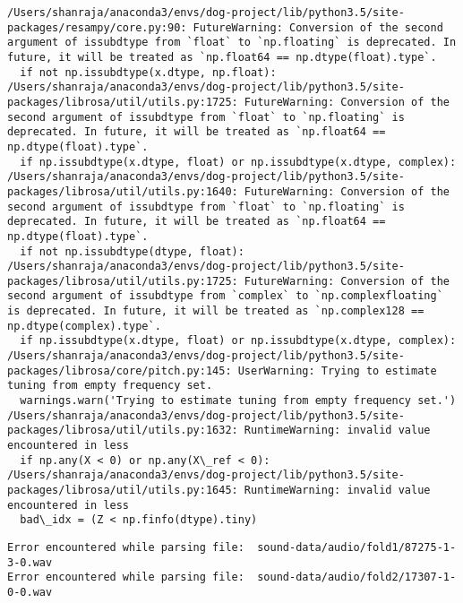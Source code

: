 \documentclass[11pt]{article}
\begin{document}
    \begin{Verbatim}[commandchars=\\\{\}]
/Users/shanraja/anaconda3/envs/dog-project/lib/python3.5/site-packages/resampy/core.py:90: FutureWarning: Conversion of the second argument of issubdtype from `float` to `np.floating` is deprecated. In future, it will be treated as `np.float64 == np.dtype(float).type`.
  if not np.issubdtype(x.dtype, np.float):
/Users/shanraja/anaconda3/envs/dog-project/lib/python3.5/site-packages/librosa/util/utils.py:1725: FutureWarning: Conversion of the second argument of issubdtype from `float` to `np.floating` is deprecated. In future, it will be treated as `np.float64 == np.dtype(float).type`.
  if np.issubdtype(x.dtype, float) or np.issubdtype(x.dtype, complex):
/Users/shanraja/anaconda3/envs/dog-project/lib/python3.5/site-packages/librosa/util/utils.py:1640: FutureWarning: Conversion of the second argument of issubdtype from `float` to `np.floating` is deprecated. In future, it will be treated as `np.float64 == np.dtype(float).type`.
  if not np.issubdtype(dtype, float):
/Users/shanraja/anaconda3/envs/dog-project/lib/python3.5/site-packages/librosa/util/utils.py:1725: FutureWarning: Conversion of the second argument of issubdtype from `complex` to `np.complexfloating` is deprecated. In future, it will be treated as `np.complex128 == np.dtype(complex).type`.
  if np.issubdtype(x.dtype, float) or np.issubdtype(x.dtype, complex):
/Users/shanraja/anaconda3/envs/dog-project/lib/python3.5/site-packages/librosa/core/pitch.py:145: UserWarning: Trying to estimate tuning from empty frequency set.
  warnings.warn('Trying to estimate tuning from empty frequency set.')
/Users/shanraja/anaconda3/envs/dog-project/lib/python3.5/site-packages/librosa/util/utils.py:1632: RuntimeWarning: invalid value encountered in less
  if np.any(X < 0) or np.any(X\_ref < 0):
/Users/shanraja/anaconda3/envs/dog-project/lib/python3.5/site-packages/librosa/util/utils.py:1645: RuntimeWarning: invalid value encountered in less
  bad\_idx = (Z < np.finfo(dtype).tiny)

    \end{Verbatim}

    \begin{Verbatim}[commandchars=\\\{\}]
Error encountered while parsing file:  sound-data/audio/fold1/87275-1-3-0.wav
Error encountered while parsing file:  sound-data/audio/fold2/17307-1-0-0.wav

    \end{Verbatim}
\end{document}
